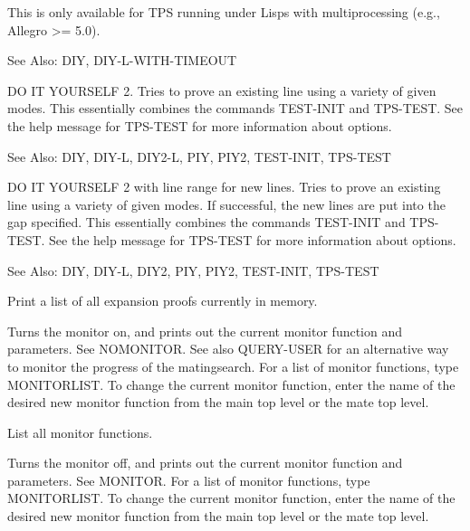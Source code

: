 \begin{description}
This is only available for TPS running under Lisps with multiprocessing
(e.g., Allegro >= 5.0).

See Also: DIY, DIY-L-WITH-TIMEOUT

\item[\parbox{\textwidth}{DIY2 \textit{goal} \textit{support} \textit{quiet-run} \textit{expu} \textit{newcore} \textit{output} \textit{timing} \textit{testwin}}]  
DO IT YOURSELF 2.  Tries to prove an existing line
using a variety of given modes.  This essentially combines the
commands TEST-INIT and TPS-TEST.  See the help message for
TPS-TEST for more information about options.

See Also: DIY, DIY-L, DIY2-L, PIY, PIY2, TEST-INIT, TPS-TEST

\item[\parbox{\textwidth}{DIY2-L \textit{goal} \textit{support} \textit{line-range} \textit{quiet-run} \textit{expu} \textit{newcore} \textit{output} \textit{timing} \textit{testwin}}]  
DO IT YOURSELF 2 with line range for new lines.  Tries to prove an existing line
using a variety of given modes.  If successful, the new lines are put into the gap
specified.   This essentially combines the commands TEST-INIT and TPS-TEST.
See the help message for TPS-TEST for more information about options.

See Also: DIY, DIY-L, DIY2, PIY, PIY2, TEST-INIT, TPS-TEST

\item[\parbox{\textwidth}{EPROOFLIST \textit{complete}}]  
Print a list of all expansion proofs currently in memory.

\item[\parbox{\textwidth}{MONITOR}]  
Turns the monitor on, and prints out the current monitor 
function and parameters. See NOMONITOR. See also QUERY-USER for an
alternative way to monitor the progress of the matingsearch.
For a list of monitor functions, type MONITORLIST. To change the current
monitor function, enter the name of the desired new monitor function from
the main top level or the mate top level.

\item[\parbox{\textwidth}{MONITORLIST}]  
List all monitor functions.

\item[\parbox{\textwidth}{NOMONITOR}]  
Turns the monitor off, and prints out the current monitor 
function and parameters. See MONITOR.
For a list of monitor functions, type MONITORLIST. To change the current 
monitor function, enter the name of the desired new monitor function from
the main top level or the mate top level.


\end{description}
